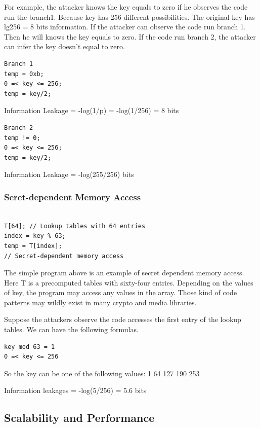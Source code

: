 For example, the attacker knows the key equals to zero if he observes the code run the branch1. 
Because key has 256 different possibilities. The original key has lg256 = 8 bits information. 
If the attacker can observe the code run branch 1. Then he will knows the key equals to zero. 
If the code run branch 2, the attacker can infer the key doesn’t equal to zero. 

\begin{lstlisting}
Branch 1
temp = 0xb;
0 =< key <= 256;
temp = key/2;
\end{lstlisting}

Information Leakage = -log(1/p) = -log(1/256) = 8 bits

\begin{lstlisting}
Branch 2
temp != 0; 
0 =< key <= 256;
temp = key/2;
\end{lstlisting}

Information Leakage = -log(255/256) bits

\subsubsection{Seret-dependent Memory Access}

\begin{lstlisting}

T[64]; // Lookup tables with 64 entries
index = key % 63;
temp = T[index]; 
// Secret-dependent memory access       

\end{lstlisting}

The simple program above is an example of secret dependent memory access. 
Here T is a precomputed tables with sixty-four entries. 
Depending on the values of key, the program may access any values in the array. 
Those kind of code patterns may wildly exist in many crypto and media libraries. 

Suppose the attackers observe the code accesses the first entry of the lookup tables. 
We can have the following formulas.

\begin{lstlisting}
key mod 63 = 1
0 =< key <= 256
\end{lstlisting}

So the key can be one of the following values:
1 64 127 190 253

Information leakages = -log(5/256) =  5.6 bits


\subsection{Scalability and Performance}

